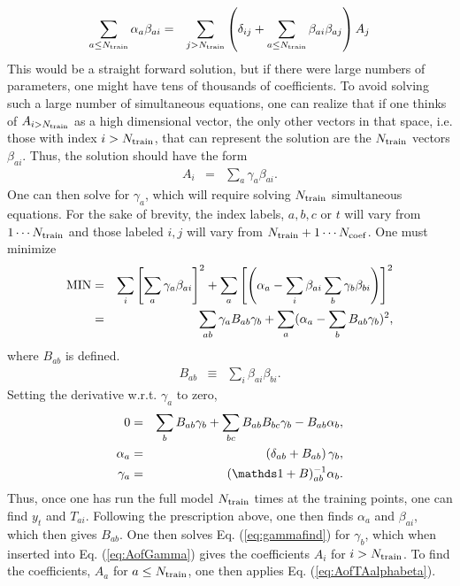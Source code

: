 \documentclass[UserManual.tex]{subfiles}
\begin{document}
\begin{eqnarray}
\sum_{a\le N_{\rm train}}\alpha_a\beta_{ai}&=&\sum_{j>N_{\rm train}} \left(\delta_{ij}+\sum_{a\le N_{\rm train}}\beta_{ai}\beta_{aj}\right)A_j
\end{eqnarray}
This would be a straight forward solution, but if there were large numbers of parameters, one might have tens of thousands of coefficients. To avoid solving such a large number of simultaneous equations, one can realize that if one thinks of $A_{i>N_{\rm train}}$ as a high dimensional vector, the only other vectors in that space, i.e. those with index $i>N_{\rm train}$, that can represent the solution are the $N_{\rm train}$ vectors $\beta_{ai}$. Thus, the solution should have the form
\begin{eqnarray}
\label{eq:AofGamma}
A_{i}&=&\sum_a\gamma_a \beta_{ai}.
\end{eqnarray}
One can then solve for $\gamma_a$, which will require solving $N_{\rm train}$ simultaneous equations. For the sake of brevity, the index labels, $a,b,c$ or $t$ will vary from $1\cdots N_{\rm train}$ and those labeled $i,j$ will vary from $N_{\rm train}+1\cdots N_{\rm coef}$. One must minimize
\begin{eqnarray}
{\rm MIN}&=&\sum_i \left[\sum_a \gamma_a\beta_{ai}\right]^2
+\sum_a\left[\left(\alpha_a-\sum_i\beta_{ai}\sum_b\gamma_b\beta_{bi}\right)\right]^2\\
\nonumber
&=&\sum_{ab}\gamma_aB_{ab}\gamma_b+\sum_a(\alpha_a-\sum_bB_{ab}\gamma_b)^2,
\end{eqnarray}
where $B_{ab}$ is defined.
\begin{eqnarray}
B_{ab}&\equiv&\sum_i\beta_{ai}\beta_{bi}.
\end{eqnarray}
Setting the derivative w.r.t. $\gamma_a$ to zero,
\begin{eqnarray}\label{eq:gammafind}
0&=&\sum_bB_{ab}\gamma_b+\sum_{bc}B_{ab}B_{bc}\gamma_b-B_{ab}\alpha_b,\\
\nonumber
\alpha_a&=&\left(\delta_{ab}+B_{ab}\right)\gamma_b,\\
\nonumber
\gamma_a&=&(\identity+B)^{-1}_{ab}\alpha_b.
\end{eqnarray}
Thus, once one has run the full model $N_{\rm train}$ times at the training points, one can find $y_t$ and $T_{ai}$. Following the prescription above, one then finds $\alpha_a$ and $\beta_{ai}$, which then gives $B_{ab}$. One then solves Eq. (\ref{eq:gammafind}) for $\gamma_b$, which when inserted into Eq. (\ref{eq:AofGamma}) gives the coefficients $A_i$ for $i>N_{\rm train}$. To find the coefficients, $A_a$ for $a\le N_{\rm train}$, one then applies Eq. (\ref{eq:AofTAalphabeta}).
\end{document}

